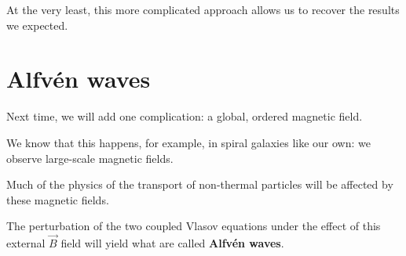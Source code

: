 \documentclass[main.tex]{subfiles}
\begin{document}
At the very least, this more complicated approach allows us to recover the results we expected. 

\section{Alfvén waves}

Next time, we will add one complication: a global, ordered magnetic field. 

We know that this happens, for example, in spiral galaxies like our own: we observe large-scale magnetic fields.  

Much of the physics of the transport of non-thermal particles will be affected by these magnetic fields. 

The perturbation of the two coupled Vlasov equations under the effect of this external \(\vec{B}\) field will yield what are called \textbf{Alfvén waves}.

\end{document}
